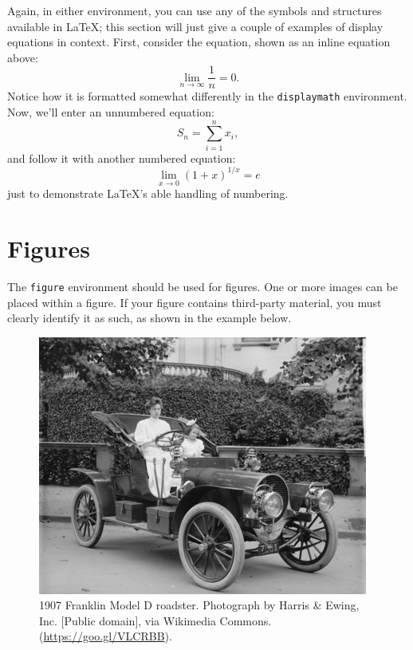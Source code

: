 \documentclass[%
]{ceurart}
\begin{document}
Again, in either environment, you can use any of the symbols and structures available in \LaTeX{}; this section will just give a couple of examples of display equations in context.
First, consider the equation, shown as an inline equation above:
\begin{equation}
  \lim_{n\rightarrow \infty} \frac{1}{n} = 0.
\end{equation}
Notice how it is formatted somewhat differently in the
\verb|displaymath|
environment.
Now, we'll enter an unnumbered equation:
\begin{displaymath}
  S_{n} = \sum_{i=1}^{n} x_{i} ,
\end{displaymath}
and follow it with another numbered equation:
\begin{equation}
  \lim_{x \to 0} (1 + x)^{1/x} = e
\end{equation}
just to demonstrate \LaTeX's able handling of numbering.

\section{Figures}

The
\verb|figure|
environment should be used for figures.
One or more images can be placed within a figure.
If your figure contains third-party material, you must clearly identify it as such, as shown in the example below.

\begin{figure}
  \centering
  \includegraphics[width=\linewidth]{sample-franklin}
  \caption{1907 Franklin Model D roadster. Photograph by Harris \&
    Ewing, Inc. [Public domain], via Wikimedia
    Commons. (\url{https://goo.gl/VLCRBB}).}
\end{figure}
\end{document}
